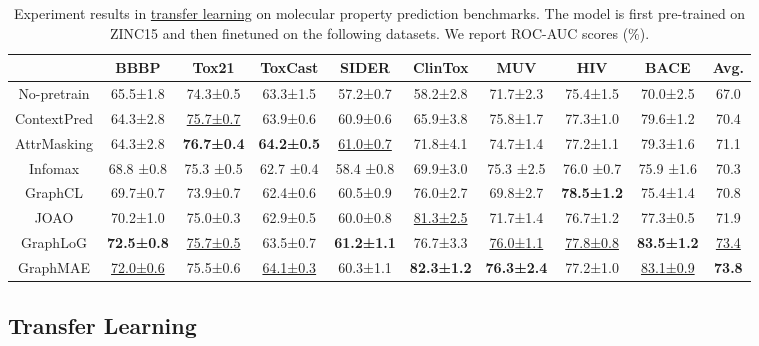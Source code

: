 \begin{table*}[htp]
\caption{Experiment results in \underline{transfer learning} on molecular property prediction benchmarks. \textmd{The model is first pre-trained on ZINC15 and then finetuned on the following datasets. We report ROC-AUC scores (\%).}}
\label{tab:mol_clf}
\renewcommand\tabcolsep{8pt}
\renewcommand\arraystretch{1.05}
\begin{tabular}{c|cccccccc|c}
\toprule[1.2pt]
                        & BBBP       & Tox21      & ToxCast    & SIDER      & ClinTox    & MUV        & HIV        & BACE & Avg.      \\
\midrule
    No-pretrain         & 65.5±1.8   & 74.3±0.5   & 63.3±1.5   & 57.2±0.7   & 58.2±2.8   & 71.7±2.3   & 75.4±1.5   & 70.0±2.5 & 67.0  \\
\midrule    
    ContextPred         & 64.3±2.8   & \underline{75.7±0.7}   & 63.9±0.6   & 60.9±0.6   & 65.9±3.8   & 75.8±1.7   & 77.3±1.0   & 79.6±1.2 & 70.4 \\
    AttrMasking         & 64.3±2.8   & \bf 76.7±0.4   & \bf 64.2±0.5   &  \underline{61.0±0.7}   & 71.8±4.1   & 74.7±1.4   & 77.2±1.1   & 79.3±1.6 & 71.1 \\
    Infomax             & 68.8 ±0.8  & 75.3 ±0.5  & 62.7 ±0.4  & 58.4 ±0.8  & 69.9±3.0  & 75.3 ±2.5  & 76.0 ±0.7  & 75.9 ±1.6 & 70.3 \\
GraphCL             & 69.7±0.7 & 73.9±0.7 & 62.4±0.6 & 60.5±0.9 & 76.0±2.7 & 69.8±2.7 & \bf 78.5±1.2 & 75.4±1.4 & 70.8 \\
    JOAO                & 70.2±1.0 & 75.0±0.3 & 62.9±0.5 & 60.0±0.8 & \underline{81.3±2.5} & 71.7±1.4 & 76.7±1.2 & 77.3±0.5 & 71.9 \\
    GraphLoG            & \bf 72.5±0.8 &  \underline{75.7±0.5}  &  63.5±0.7     & \bf 61.2±1.1  & 76.7±3.3   & \underline{76.0±1.1}    & \underline{77.8±0.8}  & \bf 83.5±1.2 & \underline{73.4} \\ 
\midrule
GraphMAE            & \underline{72.0±0.6} & 75.5±0.6 & \underline{64.1±0.3} & 60.3±1.1 & \bf 82.3±1.2 & \bf 76.3±2.4 & 77.2±1.0 & \underline{83.1±0.9} & \bf 73.8 \\
\bottomrule[1.2pt]
\end{tabular}
\end{table*}





\subsection{Transfer Learning}



